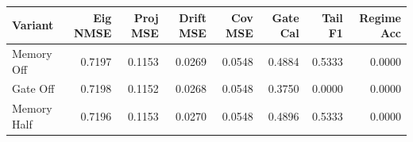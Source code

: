 \begin{tabular}{lrrrrrrr}
\toprule
Variant & Eig NMSE & Proj MSE & Drift MSE & Cov MSE & Gate Cal & Tail F1 & Regime Acc \\
\midrule
Memory Off & 0.7197 & 0.1153 & 0.0269 & 0.0548 & 0.4884 & 0.5333 & 0.0000 \\
Gate Off & 0.7198 & 0.1152 & 0.0268 & 0.0548 & 0.3750 & 0.0000 & 0.0000 \\
Memory Half & 0.7196 & 0.1153 & 0.0270 & 0.0548 & 0.4896 & 0.5333 & 0.0000 \\
\bottomrule
\end{tabular}